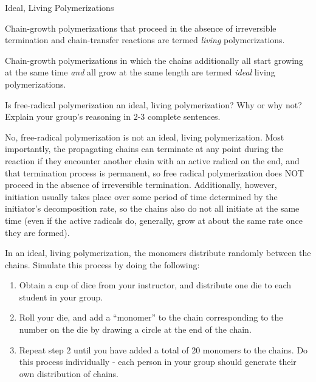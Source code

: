 \begin{activity}{Ideal, Living Polymerizations}
\begin{infobox}
	Chain-growth polymerizations that proceed in the absence of irreversible termination and chain-transfer reactions are termed \emph{living} polymerizations.
	
	Chain-growth polymerizations in which the chains additionally all start growing at the same time \emph{and} all grow at the same length are termed \emph{ideal} living polymerizations.

\end{infobox}

\begin{ctqs}

	\question Is free-radical polymerization an ideal, living polymerization?  Why or why not?  Explain your group's reasoning in 2-3 complete sentences.
	
		\begin{solution}[2in]
			No, free-radical polymerization is not an ideal, living polymerization.  Most importantly, the propagating chains can terminate at any point during the reaction if they encounter another chain with an active radical on the end, and that termination process is permanent, so free radical polymerization does NOT proceed in the absence of irreversible termination.  Additionally, however, initiation usually takes place over some period of time determined by the initiator's decomposition rate, so the chains also do not all initiate at the same time (even if the active radicals do, generally, grow at about the same rate once they are formed).
		\end{solution}

\end{ctqs}

\begin{model}
	\label{\labelbase:mdl:poisson}

		In an ideal, living polymerization, the monomers distribute randomly between the chains.  Simulate this process by doing the following:
		\begin{enumerate}
			\item Obtain a cup of dice from your instructor, and distribute one die to each student in your group.
			\item Roll your die, and add a ``monomer'' to the chain corresponding to the number on the die by drawing a circle at the end of the chain.
			\item Repeat step 2 until you have added a total of 20 monomers to the chains.  Do this process individually - each person in your group should generate their own distribution of chains.
		\end{enumerate}
		

\end{model}
\end{activity}
